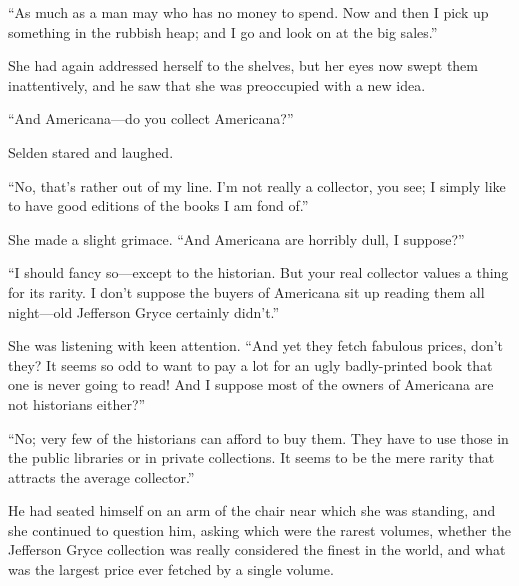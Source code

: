\documentclass[12pt,a4paper]{book}
\begin{document}
``As much as a man may who has no money to spend. Now and then I
pick up something in the rubbish heap; and I go and look on at
the big sales.''





She had again addressed herself to the shelves, but her eyes now
swept them inattentively, and he saw that she was preoccupied
with a new idea.





``And Americana---do you collect Americana?''





Selden stared and laughed.





``No, that's rather out of my line. I'm not really a collector,
you see; I simply like to have good editions of the books I am
fond of.''





She made a slight grimace. ``And Americana are horribly dull, I
suppose?''





``I should fancy so---except to the historian. But your real
collector values a thing for its rarity. I don't suppose the
buyers of Americana sit up reading them all night---old Jefferson
Gryce certainly didn't.''





She was listening with keen attention. ``And yet they fetch
fabulous prices, don't they? It seems so odd to want to pay a lot
for an ugly badly-printed book that one is never going to read! 
And I suppose most of the owners of Americana are not historians
either?''





``No; very few of the historians can afford to buy them. They have
to use those in the public libraries or in private collections. 
It seems to be the mere rarity that attracts the average
collector.''





He had seated himself on an arm of the chair near which she was
standing, and she continued to question him, asking which were
the rarest volumes, whether the Jefferson Gryce collection was
really considered the finest in the world, and what was the
largest price ever fetched by a single volume.
\end{document}
